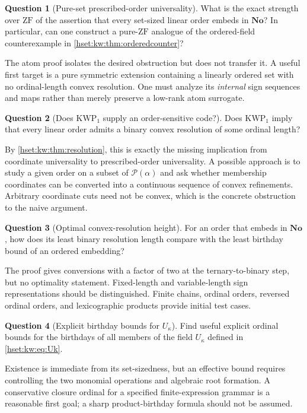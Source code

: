 \documentclass[11pt,letterpaper]{article}
\theoremstyle{definition}
\newtheorem{question}[question]{Question}\aliascntresetthe{question}
\theoremstyle{remark}
\newcommand{\No}{\mathbf{No}}
\newcommand{\Pow}{\mathcal P}
\newcommand{\ZF}{\mathrm{ZF}}
\newcommand{\KWP}{\mathrm{KWP}}
\begin{document}
\begin{question}[Pure-set prescribed-order universality]\label{hset:kw:q:prescribed}
What is the exact strength over $\ZF$ of the assertion that every set-sized linear order embeds in $\No$? In particular, can one construct a pure-$\ZF$ analogue of the ordered-field counterexample in \cref{hset:kw:thm:orderedcounter}?
\end{question}
The atom proof isolates the desired obstruction but does not transfer it. A useful first target is a pure symmetric extension containing a linearly ordered set with no ordinal-length convex resolution. One must analyze its \emph{internal} sign sequences and maps rather than merely preserve a low-rank atom surrogate.

\begin{question}[Does $\KWP_1$ supply an order-sensitive code?]\label{hset:kw:q:kwporder}
Does $\KWP_1$ imply that every linear order admits a binary convex resolution of some ordinal length?
\end{question}
By \cref{hset:kw:thm:resolution}, this is exactly the missing implication from coordinate universality to prescribed-order universality. A possible approach is to study a given order on a subset of $\Pow(\alpha)$ and ask whether membership coordinates can be converted into a continuous sequence of convex refinements. Arbitrary coordinate cuts need not be convex, which is the concrete obstruction to the naive argument.

\begin{question}[Optimal convex-resolution height]\label{hset:kw:q:resolutionheight}
For an order that embeds in $\No$, how does its least binary resolution length compare with the least birthday bound of an ordered embedding?
\end{question}
The proof gives conversions with a factor of two at the ternary-to-binary step, but no optimality statement. Fixed-length and variable-length sign representations should be distinguished. Finite chains, ordinal orders, reversed ordinal orders, and lexicographic products provide initial test cases.

\begin{question}[Explicit birthday bounds for $U_\kappa$]\label{hset:kw:q:birthdaybounds}
Find useful explicit ordinal bounds for the birthdays of all members of the field $U_\kappa$ defined in \eqref{hset:kw:eq:Uk}.
\end{question}
Existence is immediate from its set-sizedness, but an effective bound requires controlling the two monomial operations and algebraic root formation. A conservative closure ordinal for a specified finite-expression grammar is a reasonable first goal; a sharp product-birthday formula should not be assumed.
\end{document}
